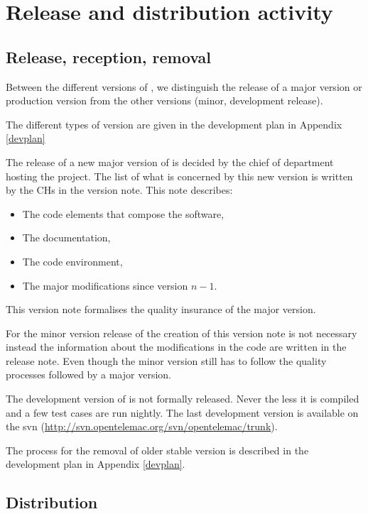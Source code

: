 \section{Release and distribution activity}

\subsection{Release, reception, removal}

Between the different versions of \telemacsystem, we distinguish the release of a major
version or production version from the other versions (minor, development
release).

The different types of version are given in the development plan in Appendix
\ref{devplan}

The release of a new major version of \telemacsystem is decided by the chief of
department hosting the \telemacsystem project. The list of what is concerned by this
new version is written by the CHs in the version note. This note describes:
\begin{itemize}
\item The code elements that compose the software,
\item The documentation,
\item The code environment,
\item The major modifications since version $n-1$.
\end{itemize}

This version note formalises the quality insurance of the major version.

For the minor version release of \telemacsystem the creation of this version note is
not necessary instead the information about the modifications in the code are
written in the release note. Even though the minor version still has to follow
the quality processes followed by a major version.

The development version of \telemacsystem is not formally released. Never the less it
is compiled and a few test cases are run nightly. The last development version
is available on the \telemacsystem svn
(\url{http://svn.opentelemac.org/svn/opentelemac/trunk}).

The process for the removal of older stable version is described in the
development plan in Appendix \ref{devplan}.

\subsection{Distribution}

